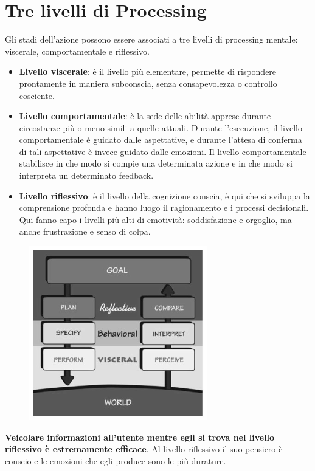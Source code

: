\section{Tre livelli di Processing}
Gli stadi dell'azione possono essere associati a tre livelli di processing mentale: viscerale, comportamentale e riflessivo.

\begin{itemize}
	\item \textbf{Livello viscerale}: è il livello più elementare, permette di rispondere prontamente in maniera subconscia, senza consapevolezza o controllo cosciente.
	\item \textbf{Livello comportamentale}: è la sede delle abilità apprese durante circostanze più o meno simili a quelle attuali. Durante l'esecuzione, il livello comportamentale è guidato dalle aspettative, e durante l'attesa di conferma di tali aspettative è invece guidato dalle emozioni. Il livello comportamentale stabilisce in che modo si compie una determinata azione e in che modo si interpreta un determinato feedback.
	\item \textbf{Livello riflessivo}: è il livello della cognizione conscia, è qui che si sviluppa la comprensione profonda e hanno luogo il ragionamento e i processi decisionali. Qui fanno capo i livelli più alti di emotività: soddisfazione e orgoglio, ma anche frustrazione e senso di colpa.
\end{itemize}

\begin{figure}[!h]
	\centering
	\includegraphics[scale=1]{"../immagini/Livelli di Processing"}
\end{figure}

\pagebreak

\textbf{Veicolare informazioni all'utente mentre egli si trova nel livello riflessivo è estremamente efficace}. Al livello riflessivo il suo pensiero è conscio e le emozioni che egli produce sono le più durature.

